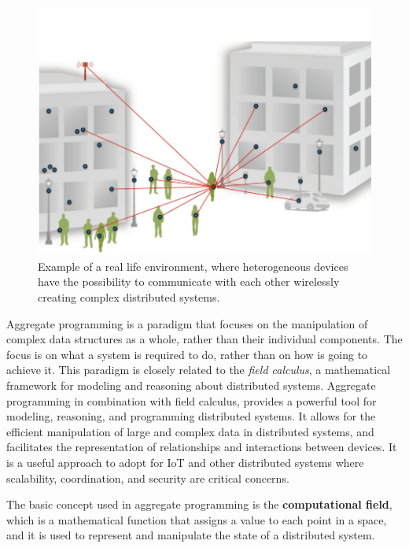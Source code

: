 \begin{figure}[!ht]
    \centering
    \includegraphics[scale=0.8]{document/chapters/1-introduction/images/iot_connected_things.png}
    \caption{Example of a real life environment, where heterogeneous devices have the possibility to communicate with each other wirelessly creating complex distributed systems. \cite{aggregate_programmig_iot}}
    \label{fig:iot_connected_things}
\end{figure}

Aggregate programming is a paradigm that focuses on the manipulation of complex data structures as a whole, rather than their individual components. The focus is on what a system is required to do, rather than on how is going to achieve it.\newline
This paradigm is closely related to the \textit{field calculus}, a mathematical framework for modeling and reasoning about distributed systems.\newline
Aggregate programming in combination with field calculus, provides a powerful tool for modeling, reasoning, and programming distributed systems. It allows for the efficient manipulation of large and complex data in distributed systems, and facilitates the representation of relationships and interactions between devices. It is a useful approach to adopt for IoT and other distributed systems where scalability, coordination, and security are critical concerns.

The basic concept used in aggregate programming is the \textbf{computational field}, which is a mathematical function that assigns a value to each point in a space, and it is used to represent and manipulate the state of a distributed system.

